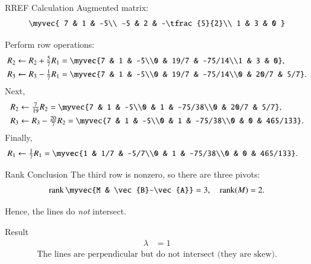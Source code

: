 \documentclass{beamer}
\begin{document}
\begin{frame}{RREF Calculation}
Augmented matrix:
\begin{align}
\myvec{
7 & 1 & -5\\
-5 & 2 & -\tfrac{5}{2}\\
1 & 3 & 0
}
\end{align}

Perform row operations:
\begin{align}
R_2 &\leftarrow R_2 + \tfrac{5}{7}R_1 =
\myvec{7 & 1 & -5\\0 & 19/7 & -75/14\\1 & 3 & 0},\\
R_3 &\leftarrow R_3 - \tfrac{1}{7}R_1 =
\myvec{7 & 1 & -5\\0 & 19/7 & -75/14\\0 & 20/7 & 5/7}.
\end{align}
Next,
\begin{align}
R_2 &\leftarrow \tfrac{7}{19} R_2 =
\myvec{7 & 1 & -5\\0 & 1 & -75/38\\0 & 20/7 & 5/7},\\
R_3 &\leftarrow R_3 - \tfrac{20}{7} R_2 =
\myvec{7 & 1 & -5\\0 & 1 & -75/38\\0 & 0 & 465/133}.
\end{align}
Finally,
\begin{align}
R_1 &\leftarrow \tfrac{1}{7} R_1 =
\myvec{1 & 1/7 & -5/7\\0 & 1 & -75/38\\0 & 0 & 465/133}.
\end{align}
\end{frame}

\begin{frame}{Rank Conclusion}
The third row is nonzero, so there are three pivots:
\begin{align}
\operatorname{rank}\myvec{M & \vec{B}-\vec{A}} = 3, \quad
\operatorname{rank}(M) = 2.
\end{align}

Hence, the lines do \emph{not} intersect.
\end{frame}

\begin{frame}{Result}
\begin{align}
\lambda &= 1
\end{align}
\begin{align}
\text{The lines are perpendicular but do not intersect (they are skew).}
\end{align}
\end{frame}
\end{document}
